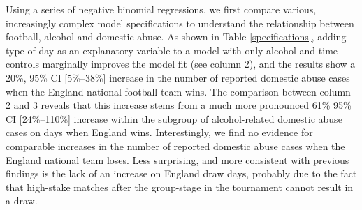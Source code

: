 \documentclass[12pt, letterpaper]{article}
\begin{document}
Using a series of negative binomial regressions, we first compare various, increasingly complex model specifications to understand the relationship between football, alcohol and domestic abuse.  As shown in Table \ref{specifications}, adding type of day as an explanatory variable to a model with only alcohol and time controls marginally improves the model fit (see column 2), and the results show a 20\%, 95\% CI [5\%--38\%] increase in the number of reported domestic abuse cases when the England national football team wins. The comparison between column 2 and 3 reveals that this increase stems from a much more pronounced 61\% 95\% CI [24\%--110\%] increase within the subgroup of alcohol-related domestic abuse cases on days when England wins. Interestingly, we find no evidence for comparable increases in the number of reported domestic abuse cases when the England national team loses. Less surprising, and more consistent with previous findings is the lack of an increase on England draw days, probably due to the fact that high-stake matches after the group-stage in the tournament cannot result in a draw. 
\end{document}
